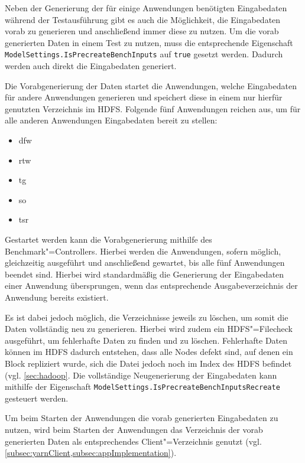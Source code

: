 Neben der Generierung der für einige Anwendungen benötigten Eingabedaten während der Testausführung gibt es auch die Möglichkeit, die Eingabedaten vorab zu generieren und anschließend immer diese zu nutzen.
Um die vorab generierten Daten in einem Test zu nutzen, muss die entsprechende Eigenschaft \texttt{ModelSettings.IsPrecreateBenchInputs} auf \texttt{true} gesetzt werden.
Dadurch werden auch direkt die Eingabedaten generiert.

Die Vorabgenerierung der Daten startet die Anwendungen, welche Eingabedaten für andere Anwendungen generieren und speichert diese in einem nur hierfür genutzten Verzeichnis im \ac{HDFS}.
Folgende fünf Anwendungen reichen aus, um für alle anderen Anwendungen Eingabedaten bereit zu stellen:

\begin{itemize}
    \item \acl{dfw}
    \item \acl{rtw}
    \item \acl{tg}
    \item \acl{so}
    \item \acl{tsr}
\end{itemize}

Gestartet werden kann die Vorabgenerierung mithilfe des Benchmark"=Controllers.
Hierbei werden die Anwendungen, sofern möglich, gleichzeitig ausgeführt und anschließend gewartet, bis alle fünf Anwendungen beendet sind.
Hierbei wird standardmäßig die Generierung der Eingabedaten einer Anwendung übersprungen, wenn das entsprechende Ausgabeverzeichnis der Anwendung bereits existiert.

Es ist dabei jedoch möglich, die Verzeichnisse jeweils zu löschen, um somit die Daten vollständig neu zu generieren.
Hierbei wird zudem ein \ac{HDFS}"=Filecheck ausgeführt, um fehlerhafte Daten zu finden und zu löschen.
Fehlerhafte Daten können im \ac{HDFS} \zB dadurch entstehen, dass alle Nodes defekt sind, auf denen ein Block repliziert wurde, sich die Datei jedoch noch im Index des \ac{HDFS} befindet (vgl. \cref{sec:hadoop}.
Die vollständige Neugenerierung der Eingabedaten kann mithilfe der Eigenschaft \texttt{ModelSettings.IsPrecreateBenchInputsRecreate} gesteuert werden.

Um beim Starten der Anwendungen die vorab generierten Eingabedaten zu nutzen, wird beim Starten der Anwendungen das Verzeichnis der vorab generierten Daten als entsprechendes Client"=Verzeichnis genutzt (vgl. \cref{subsec:yarnClient,subsec:appImplementation}).
